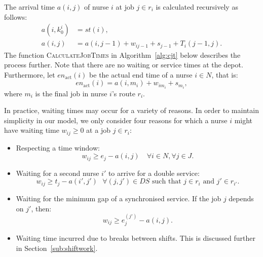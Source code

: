 \documentclass[a4paper,11pt,authoryear]{elsarticle}
\begin{document}

The arrival time $a(i,j)$ of nurse $i$ at job $j \in r_i$ is calculated recursively as follows:
\begin{subequations}
	\begin{align}
		a(i,k_0^i) &= st(i), \label{eq:recursionarrivalbase}\\[3pt]
		a(i,j) &= a(i,j-1) + w_{ij-1} + s_{j-1} + T_i(j-1, j). \label{eq:arrivaltime}
	\end{align}
\end{subequations}
The function \textsc{CalculateJobTimes} in Algorithm~\ref{alg:cjt} below describes the process further. Note that there are no waiting or service times at the depot. Furthermore, let $en_{\text{act}}(i)$ be the actual end time of a nurse $i \in N$, that is:
\begin{equation}
	en_{\text{act}}(i) = a(i,m_i) + w_{im_i} + s_{m_i}, \label{eq:actualendtime}
\end{equation}
where $m_i$ is the final job in nurse $i$'s route $r_i$.


In practice, waiting times may occur for a variety of reasons. In order to maintain simplicity in our model, we only consider four reasons for which a nurse $i$ might have waiting time $w_{ij} \geq 0$ at a job $j \in r_i$:
\begin{itemize}
    \item Respecting a time window: 
    \begin{equation}
        w_{ij} \geq e_j - a(i,j) \quad \forall i \in N, \forall j \in J. \label{eq:waiting1TW}
    \end{equation}
    \item Waiting for a second nurse $i'$ to arrive for a double service:
    \begin{equation}
       w_{i j} \geq t_j - a(i',j') \text{ } \forall (j,j') \in DS \text{ such that } j \in r_{i} \text{ and } j' \in r_{i'}. \label{eq:waiting2DS}
    \end{equation}
    \item Waiting for the minimum gap of a synchronised service. If the job $j$ depends on $j'$, then:
    \begin{equation}\label{eq:waiting3dependent}
        w_{ij} \geq e^{(j')}_{j} - a(i,j).
    \end{equation}
	\item Waiting time incurred due to breaks between shifts. This is discussed further in Section~\ref{sub:shiftwork}.
\end{itemize}
\end{document}
